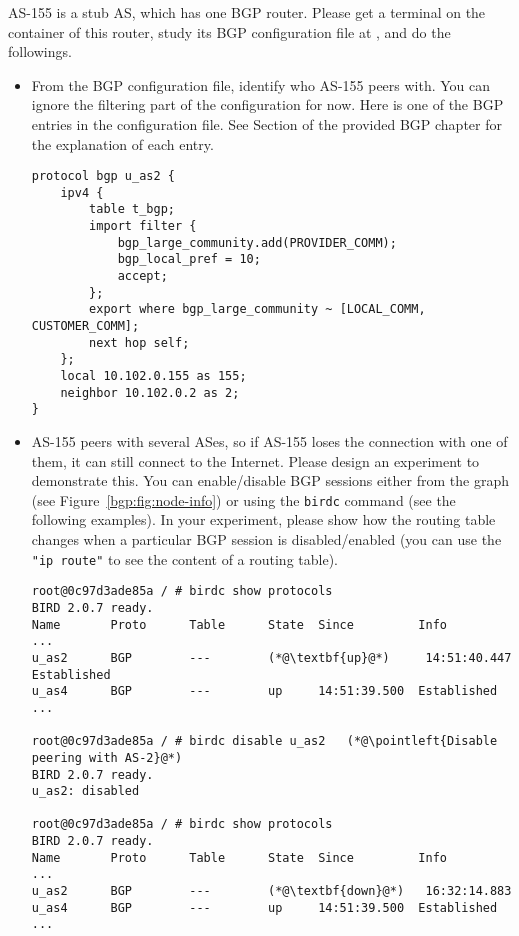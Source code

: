 AS-155 is a stub AS, which has one BGP router. Please  
get a terminal on the container of this router, study its 
BGP configuration file at , and
do the followings.

\begin{itemize}
  \item From the BGP configuration file, identify who
    AS-155 peers with. You can ignore the filtering
    part of the configuration for now. Here is one of the
    BGP entries in the configuration file. See Section \bgppeering 
    of the provided BGP chapter for the explanation of each entry.
    
\begin{lstlisting}
protocol bgp u_as2 {
    ipv4 {
        table t_bgp;
        import filter {
            bgp_large_community.add(PROVIDER_COMM);
            bgp_local_pref = 10;
            accept;
        };
        export where bgp_large_community ~ [LOCAL_COMM, CUSTOMER_COMM];
        next hop self;
    };
    local 10.102.0.155 as 155;
    neighbor 10.102.0.2 as 2;
}
\end{lstlisting}
     

  \item AS-155 peers with several ASes, so if AS-155
    loses the connection with one of them, it can still connect
    to the Internet. Please design an experiment to 
    demonstrate this. You can enable/disable BGP sessions
    either from the graph (see Figure~\ref{bgp:fig:node-info}) or
    using the \texttt{birdc} command (see the following examples). 
    In your experiment, please show how the routing table changes when a particular 
    BGP session is disabled/enabled (you can use the \texttt{"ip route"} to 
    see the content of a routing table). 


\begin{lstlisting}
root@0c97d3ade85a / # birdc show protocols
BIRD 2.0.7 ready.
Name       Proto      Table      State  Since         Info
...
u_as2      BGP        ---        (*@\textbf{up}@*)     14:51:40.447  Established
u_as4      BGP        ---        up     14:51:39.500  Established
...

root@0c97d3ade85a / # birdc disable u_as2   (*@\pointleft{Disable peering with AS-2}@*) 
BIRD 2.0.7 ready.
u_as2: disabled

root@0c97d3ade85a / # birdc show protocols
BIRD 2.0.7 ready.
Name       Proto      Table      State  Since         Info
...
u_as2      BGP        ---        (*@\textbf{down}@*)   16:32:14.883
u_as4      BGP        ---        up     14:51:39.500  Established
...
\end{lstlisting}

\end{itemize}


